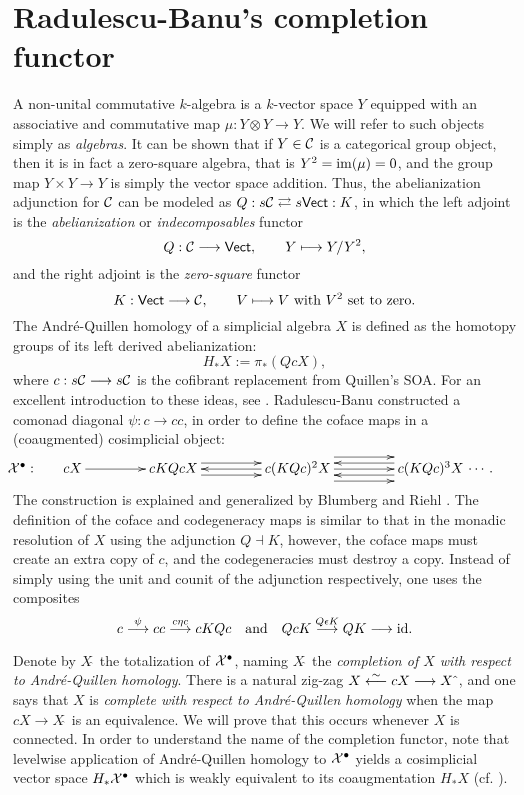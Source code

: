 \documentclass[11pt]{amsart}
\theoremstyle{plain}
\begin{document}
\section{Radulescu-Banu's completion functor}\label{introToRBwork}
A non-unital commutative $k$-algebra is a $k$-vector space $Y$ equipped with an associative and commutative map $\mu:Y\otimes Y\to Y$. We will refer to such objects simply as \emph{algebras}. It can be shown that if $Y\in\calC$ is a categorical group object, then it is in fact a zero-square algebra, that is  $Y^2=\im(\mu)=0$, and the group map $Y\times Y\to Y$ is simply the vector space addition. Thus, the abelianization adjunction for $\calC$ can be modeled as $Q:s\calC\rightleftarrows s\mathsf{Vect}:K$, in which the left adjoint is the \emph{abelianization} or \emph{indecomposables} functor
\[Q:\calC\to \mathsf{Vect},\qquad Y\mapsto Y/Y^2,\]
and the right adjoint is the \emph{zero-square} functor
\[K:\mathsf{Vect}\to\calC,\qquad V\mapsto V\textup{ with $V^2$ set to zero}.\]
The Andr\'e-Quillen homology of a simplicial algebra $X$ is defined as the homotopy groups of its left derived abelianization:
\[H_*X:=\pi_*(QcX),\]
where $c:s\calC\to s\calC$ is the cofibrant replacement from Quillen's SOA. For an excellent introduction to these ideas, see \cite[\S4]{MR1089001}. Radulescu-Banu constructed \cite{Radulescu-Banu.pdf} a comonad diagonal $\psi:c\to cc$, in order to define the coface maps in a (coaugmented) cosimplicial object:
\[\makebox[0cm][r]{\,$\calX^\bullet:\qquad $}\vcenter{
\def\labelstyle{\scriptstyle}
\xymatrix@C=1.5cm@1{
cX\,
\ar[r]
&
\,cKQcX\,
\ar[r];[]
&
\,c(KQc)^2X\,
\ar@<-1ex>[l];[]
\ar@<+1ex>[l];[]
\ar@<+1ex>[r];[]
\ar@<-1ex>[r];[]
&
\,c(KQc)^3X\,\makebox[0cm][l]{\,$\cdots. $}
\ar[l];[]
\ar@<-2ex>[l];[]
\ar@<+2ex>[l];[]
}}\]
The construction is explained and generalized by Blumberg and Riehl \cite{BlumRiehlResolutions.pdf}. The definition of the coface and codegeneracy maps is similar to that in the monadic resolution of $X$ using the adjunction $Q\dashv K$, however, the coface maps must create an extra copy of $c$, and the codegeneracies must destroy a copy.  Instead of simply using the unit and counit of the adjunction respectively, one uses the composites
\[c\overset{\psi}{\to}cc\overset{c\eta c}{\to}cKQc\textup{\quad and\quad }QcK\overset{Q\epsilon K}{\to}QK\to \textup{id}.\]


Denote by $X\hat{\ }$ the totalization of $\calX^\bullet$, naming $X\hat{\ }$ the \emph{completion of $X$ with respect to Andr\'e-Quillen homology}. There is a natural zig-zag $X\overset{\sim}{\from} cX\to X\hat{\ }$, and one says that $X$ is \emph{complete with respect to Andr\'e-Quillen homology} when the map $cX\to X\hat{\ }$ is an equivalence. We will prove that this occurs whenever $X$ is connected. In order to understand the name of the completion functor, note that levelwise application of Andr\'e-Quillen homology to $\calX^\bullet$ yields a cosimplicial vector space $H_*\calX^\bullet$ which is weakly equivalent to its coaugmentation $H_*X$ (cf. \cite{BlumRiehlResolutions.pdf}).
\end{document}
